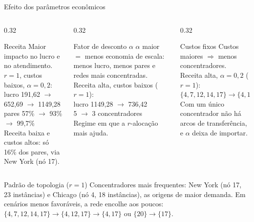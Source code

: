 \documentclass[aspectratio=169, 10pt]{beamer}
\begin{document}
\begin{frame}{Efeito dos parâmetros econômicos}
  \small
  \begin{columns}[T]
    \begin{column}{0.32\textwidth}
      \begin{block}{Receita}
        \scriptsize
        Maior impacto no lucro e no atendimento.\\[3pt]
        $r=1$, custos baixos, $\alpha=0{,}2$:\\
        lucro 191,62 $\to$ 652,69 $\to$ 1149,28\\
        pares 57\% $\to$ 93\% $\to$ 99,7\%\\[3pt]
        Receita baixa e custos altos: só 16\% dos pares, via New York (nó 17).
      \end{block}
    \end{column}
    \begin{column}{0.32\textwidth}
      \begin{block}{Fator de desconto $\alpha$}
        \scriptsize
        $\alpha$ maior $=$ menos economia de escala: menos lucro, menos pares e redes mais concentradas.\\[3pt]
        Receita alta, custos baixos ($r=1$):\\
        lucro 1149,28 $\to$ 736,42\\
        5 $\to$ 3 concentradores\\[3pt]
        Regime em que a $r$-alocação mais ajuda.
      \end{block}
    \end{column}
    \begin{column}{0.32\textwidth}
      \begin{block}{Custos fixos}
        \scriptsize
        Custos maiores $\Rightarrow$ menos concentradores.\\[3pt]
        Receita alta, $\alpha=0{,}2$ ($r=1$):\\
        $\{4,7,12,14,17\} \to \{4,12,17\}$\\[3pt]
        Com um único concentrador não há arcos de transferência, e $\alpha$ deixa de importar.
      \end{block}
    \end{column}
  \end{columns}

  \vspace{0.3cm}
  \begin{alertblock}{Padrão de topologia ($r=1$)}
    \scriptsize
    Concentradores mais frequentes: New York (nó 17, 23 instâncias) e Chicago (nó 4, 18 instâncias), as origens de maior demanda. Em cenários menos favoráveis, a rede encolhe aos poucos:
    $\{4,7,12,14,17\} \to \{4,12,17\} \to \{4,17\}$ ou $\{20\} \to \{17\}$.
  \end{alertblock}
\end{frame}
\end{document}
